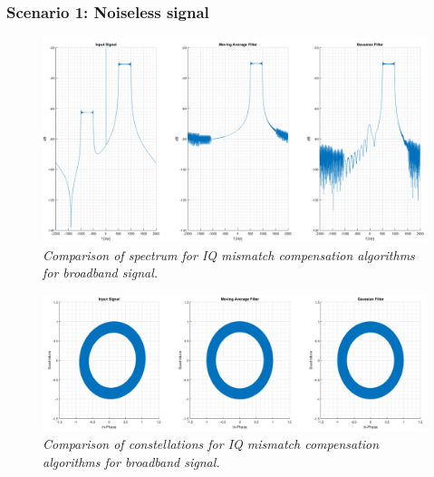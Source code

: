 \documentclass[en,printmode]{mgr}
\begin{document}
		\subsubsection*{Scenario 1: Noiseless signal}
			\begin{figure}[!htb]
    			\centering
   				\includegraphics[width=\textwidth]{plots/band_f.png}
   		 		\caption{\textit{Comparison of spectrum for IQ mismatch compensation algorithms for
   		 		broadband signal.}}
   		 	\end{figure}	
   		 	\begin{figure}[!htb]
    			\centering
   				\includegraphics[width=\textwidth]{plots/band_c.png}
   		 		\caption{\textit{Comparison of constellations for IQ mismatch compensation algorithms 
   		 		for broadband signal.}}
   		 	\end{figure}
   		\newpage
\end{document}
